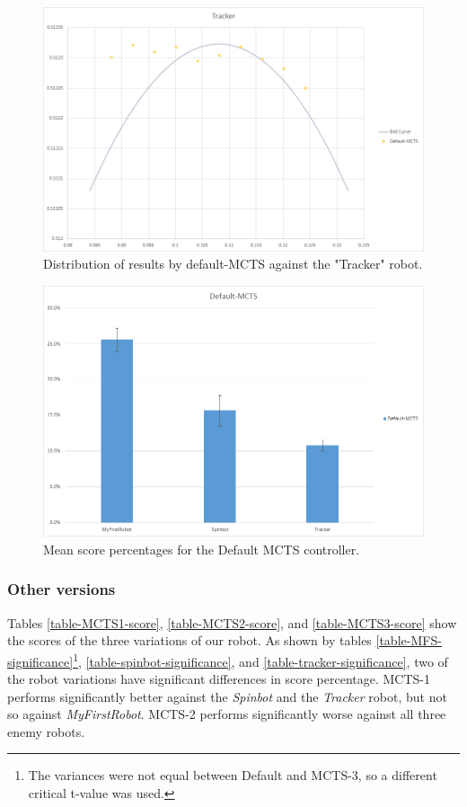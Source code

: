\begin{figure}[htp]
\centerline{\includegraphics[width=\columnwidth]{Images/TrackerDistribution}}
\caption{Distribution of results by default-MCTS against the "Tracker" robot.}
\label{figure--Distribution-Tracker}
\end{figure}

\begin{figure}[htp]
\centerline{\includegraphics[width=\columnwidth]{Images/BarGraph}}
\caption{Mean score percentages for the Default MCTS controller.}
\label{figure-BarGraph}
\end{figure}

\subsubsection{Other versions}
Tables \ref{table-MCTS1-score}, \ref{table-MCTS2-score}, and \ref{table-MCTS3-score} show the scores of the three variations of our robot. As shown by tables \ref{table-MFS-significance}\footnote{The variances were not equal between Default and MCTS-3, so a different critical t-value was used.}, \ref{table-spinbot-significance}, and \ref{table-tracker-significance}, two of the robot variations have significant differences in score percentage. MCTS-1 performs significantly better against the \textit{Spinbot} and the \textit{Tracker} robot, but not so against \textit{MyFirstRobot}. MCTS-2 performs significantly worse against all three enemy robots.

